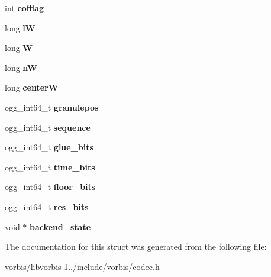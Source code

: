\begin{DoxyCompactItemize}
\item 
\hypertarget{structvorbis__dsp__state_af48b32e7555d54a5d18a24385f1296d0}{int {\bfseries eofflag}}\label{structvorbis__dsp__state_af48b32e7555d54a5d18a24385f1296d0}

\item 
\hypertarget{structvorbis__dsp__state_a7086b355f6ffe286f388e95df943cac0}{long {\bfseries l\+W}}\label{structvorbis__dsp__state_a7086b355f6ffe286f388e95df943cac0}

\item 
\hypertarget{structvorbis__dsp__state_a1cc3a520dcf831fb967341e5095c7b38}{long {\bfseries W}}\label{structvorbis__dsp__state_a1cc3a520dcf831fb967341e5095c7b38}

\item 
\hypertarget{structvorbis__dsp__state_a2ada93ee1004bcc0803238ee4416bc1e}{long {\bfseries n\+W}}\label{structvorbis__dsp__state_a2ada93ee1004bcc0803238ee4416bc1e}

\item 
\hypertarget{structvorbis__dsp__state_a241d3dc3b6c931e93ce53cbf69282350}{long {\bfseries center\+W}}\label{structvorbis__dsp__state_a241d3dc3b6c931e93ce53cbf69282350}

\item 
\hypertarget{structvorbis__dsp__state_af84a7a4855db2744d1ef73f48cb6b352}{ogg\+\_\+int64\+\_\+t {\bfseries granulepos}}\label{structvorbis__dsp__state_af84a7a4855db2744d1ef73f48cb6b352}

\item 
\hypertarget{structvorbis__dsp__state_a38a8b96daf9d16d8cce0522e203635a6}{ogg\+\_\+int64\+\_\+t {\bfseries sequence}}\label{structvorbis__dsp__state_a38a8b96daf9d16d8cce0522e203635a6}

\item 
\hypertarget{structvorbis__dsp__state_ae2d065c13e84870fd889c82cd2e7a04f}{ogg\+\_\+int64\+\_\+t {\bfseries glue\+\_\+bits}}\label{structvorbis__dsp__state_ae2d065c13e84870fd889c82cd2e7a04f}

\item 
\hypertarget{structvorbis__dsp__state_adef49c2187f4ed3381973274e1b01151}{ogg\+\_\+int64\+\_\+t {\bfseries time\+\_\+bits}}\label{structvorbis__dsp__state_adef49c2187f4ed3381973274e1b01151}

\item 
\hypertarget{structvorbis__dsp__state_a2913a4ebbbd6721c53264a2ca8466cea}{ogg\+\_\+int64\+\_\+t {\bfseries floor\+\_\+bits}}\label{structvorbis__dsp__state_a2913a4ebbbd6721c53264a2ca8466cea}

\item 
\hypertarget{structvorbis__dsp__state_a3091c7fac6b57c54027c32931a7e6ee0}{ogg\+\_\+int64\+\_\+t {\bfseries res\+\_\+bits}}\label{structvorbis__dsp__state_a3091c7fac6b57c54027c32931a7e6ee0}

\item 
\hypertarget{structvorbis__dsp__state_a97ff4df8d289e5e3968029e47d7f8162}{void $\ast$ {\bfseries backend\+\_\+state}}\label{structvorbis__dsp__state_a97ff4df8d289e5e3968029e47d7f8162}

\end{DoxyCompactItemize}


The documentation for this struct was generated from the following file\+:\begin{DoxyCompactItemize}
\item 
vorbis/libvorbis-\/1../include/vorbis/codec.\+h\end{DoxyCompactItemize}
